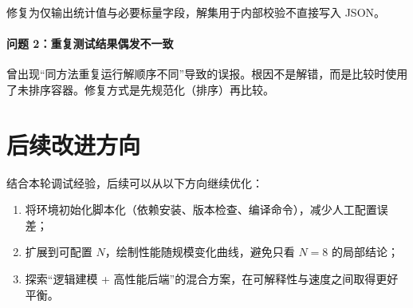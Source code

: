 修复为仅输出统计值与必要标量字段，解集用于内部校验不直接写入 JSON。

\paragraph{问题 2：重复测试结果偶发不一致}
曾出现“同方法重复运行解顺序不同”导致的误报。根因不是解错，而是比较时使用了未排序容器。修复方式是先规范化（排序）再比较。


\section{后续改进方向}

结合本轮调试经验，后续可以从以下方向继续优化：
\begin{enumerate}
    \item 将环境初始化脚本化（依赖安装、版本检查、编译命令），减少人工配置误差；
    \item 扩展到可配置 $N$，绘制性能随规模变化曲线，避免只看 $N=8$ 的局部结论；
    \item 探索“逻辑建模 + 高性能后端”的混合方案，在可解释性与速度之间取得更好平衡。
\end{enumerate}
